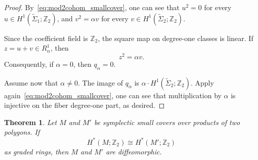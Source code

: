 \documentclass{amsart}
\newtheorem{theorem}{Theorem}[section]
\numberwithin{equation}{section}
\theoremstyle{definition}
\theoremstyle{remark}
\newcommand{\Z}{\mathbb Z}
\begin{document}
\begin{proof}
    By~\eqref{eq:mod2cohom_smallcover}, one can see that $u^2=0$ for every $u\in H^1(\widetilde\Sigma_1;\Z_2)$, and $v^2= \alpha v$ for every $v\in H^1(\widetilde\Sigma_2;\Z_2)$.
    
    Since the coefficient field is $\Z_2$, the square map on degree-one classes is linear. 
    If $z=u+v\in R_\alpha^1$, then
    $$
        z^2= \alpha v.
    $$
    Consequently, if $\alpha=0$, then $q_\alpha=0$.
    
    Assume now that $\alpha\ne0$. The image of $q_\alpha$ is $\alpha\cdot H^1(\widetilde\Sigma_2;\Z_2)$.
    Apply again~\eqref{eq:mod2cohom_smallcover}, one can see that multiplication by $\alpha$ is injective on the fiber degree-one part, as desired.
\end{proof}

\begin{theorem}\label{thm:two-stage-mod2-rigidity}
    Let $M$ and $M'$ be symplectic small covers over products of two polygons. 
    If
    $$
        H^\ast(M;\Z_2)\cong H^\ast(M';\Z_2)
    $$
    as graded rings, then $M$ and $M'$ are diffeomorphic.
\end{theorem}
\end{document}
